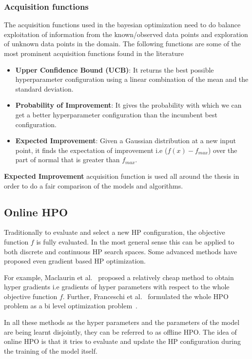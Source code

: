 \documentclass[12pt, twoside, ngerman]{report}
\begin{document}
\subsubsection{Acquisition functions}
The acquisition functions used in the bayesian optimization need to do balance exploitation of information from the known/observed data points and exploration of unknown data points in the domain.
The following functions are some of the most prominent acquisition functions found in the literature~\cite{GPTutorial}
\begin{itemize}
\item \textbf{Upper Confidence Bound (UCB)}: It returns the best possible hyperparameter configuration using a linear combination of the mean and the standard deviation.
\item \textbf{Probability of Improvement}: It gives the probability with which we can get a better hyperparameter configuration than the incumbent best configuration.
\item \textbf{Expected Improvement}: Given a Gaussian distribution at a new input point, it finds the expectation of improvement i.e ($f(x) - f_{max}$) over the part of normal that is greater than $f_{max}$.
\end{itemize}

 \textbf{Expected Improvement} acquisition function is used all around the thesis in order to do a fair comparison of the models and algorithms.

\subsection{Online HPO}
Traditionally to evaluate and select a new HP configuration,  the objective function $f$ is fully evaluated.
In the most general sense this can be applied to both discrete and continuous HP search spaces.
Some advanced methods have proposed even gradient based HP optimization.

For example,  Maclaurin et al.~\cite{hypergradient} proposed a relatively cheap method to obtain hyper gradients i.e gradients of hyper parameters with respect to the whole objective function $f$.
Further,  Franceschi et al.~\cite{HPOAsBilevelOptimization} formulated the whole HPO problem as a bi level optimization problem~\cite{hutterneuripstutorial}.

In all these methods as the hyper parameters and the parameters of the model are being learnt disjointly,  they can be referred to as offline HPO.
The idea of online HPO is that it tries to evaluate and update the HP configuration during the training of the model itself.
\end{document}
